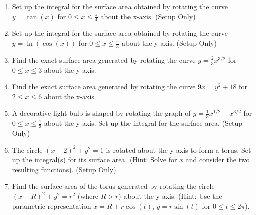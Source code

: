 \documentclass{article}
\begin{document}
\begin{enumerate}
    \item Set up the integral for the surface area obtained by rotating the curve $y = \tan(x)$ for $0 \le x \le \frac{\pi}{4}$ about the x-axis. (Setup Only)

    \item Set up the integral for the surface area obtained by rotating the curve $y = \ln(\cos(x))$ for $0 \le x \le \frac{\pi}{3}$ about the y-axis. (Setup Only)

    \item Find the exact surface area generated by rotating the curve $y=\frac{2}{3}x^{3/2}$ for $0 \le x \le 3$ about the y-axis.

    \item Find the exact surface area generated by rotating the curve $9x = y^2+18$ for $2 \le x \le 6$ about the x-axis.

    \item A decorative light bulb is shaped by rotating the graph of $y = \frac{1}{3}x^{1/2} - x^{3/2}$ for $0 \le x \le \frac{1}{3}$ about the y-axis. Set up the integral for the surface area. (Setup Only)
    
    \item The circle $(x-2)^2 + y^2 = 1$ is rotated about the y-axis to form a torus. Set up the integral(s) for its surface area. (Hint: Solve for $x$ and consider the two resulting functions). (Setup Only)
    
    \item Find the surface area of the torus generated by rotating the circle $(x-R)^2 + y^2 = r^2$ (where $R>r$) about the y-axis. (Hint: Use the parametric representation $x=R+r\cos(t)$, $y=r\sin(t)$ for $0 \le t \le 2\pi$).

\end{enumerate}
\end{document}

